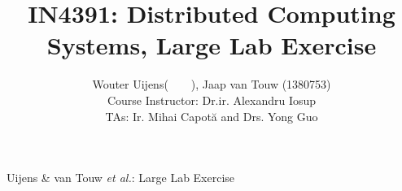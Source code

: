 \documentclass[12pt,journal, compsoc]{IEEEtran}
\begin{document}
\title{IN4391: Distributed Computing Systems, Large Lab Exercise}

\author{Wouter Uijens(~~~~), Jaap van Touw (1380753) \\Course Instructor: Dr.ir. Alexandru Iosup\\ TAs: Ir. Mihai Capot\u{a}  and Drs. Yong Guo\\ }

{Uijens \& van Touw \MakeLowercase{\textit{et al.}}:  Large Lab Exercise}

\IEEEtitleabstractindextext{

}

\maketitle
\IEEEdisplaynontitleabstractindextext
\IEEEpeerreviewmaketitle
\nocite{*}
	
			
					
			
			




\appendix


\end{document}
